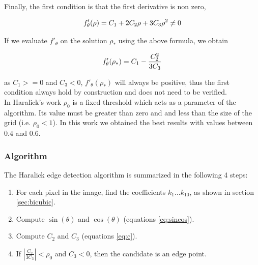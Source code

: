 \documentclass{ipol}
\numberwithin{equation}{section}
\numberwithin{table}{section}
\begin{document}
Finally,  the first condition is that the first derivative is non zero, 

\begin{equation}\label{eq:cond:first}
f'_{\theta}(\rho) = C_1 + 2C_2\rho + 3C_3\rho^2 \neq 0 \\
\end{equation}

\myn{\label{second:haralick:analytical:first}} If we evaluate $f'_{\theta}$ on the solution $\rho_*$ using the above formula, we obtain

\begin{equation}\label{eq:cond:first:optim}
f'_{\theta}(\rho_*) = C_1 - \frac{C_2^2}{3C_3}  \\
\end{equation}

as $C_1>=0$ and $C_3<0$, $f'_{\theta}(\rho_*)$ will always be positive, thus the first condition always hold by construction and does not need to be verified.\\

In Haralick's work $\rho_0$ is a fixed threshold which acts as a parameter of the algorithm.
Its value must be greater than zero and and less than the size of the grid (i.e. $\rho_0<1$). In this work we obtained the best results with values between $0.4$ and $0.6$.\\


\subsubsection{Algorithm}

The Haralick edge detection algorithm is summarized in the following 4 steps:

\begin{enumerate}
	\item For each pixel in the image, find the coefficients $k_1 \hdots k_{10}$, as shown in section \ref{sec:bicubic}.
	\item Compute $\sin(\theta)$ and $\cos(\theta)$ (equations \ref{eq:sincos}).
	\item Compute $C_2$ and $C_3$ (equations \ref{eq:c}).
	\item If $\left| \frac{C_2}{3C_3} \right| < \rho_0$ and $C_3 < 0$, then the candidate is an edge point.
\end{enumerate}

\end{document}

